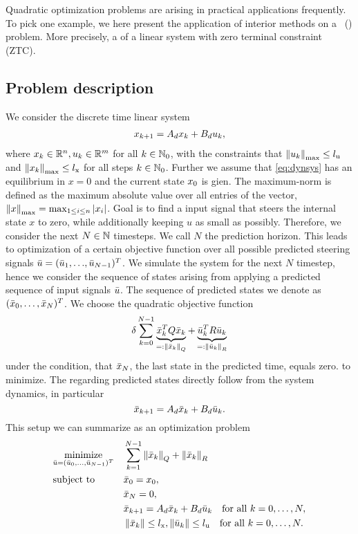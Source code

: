 Quadratic optimization problems are arising in practical applications frequently. To pick one example, we here present the application of interior methods on a \mpclong \ (\mpc) problem. More precisely, a \mpc of a linear system with zero terminal constraint (ZTC).

\subsection{Problem description \mpc}
We consider the discrete time linear system
\begin{align}
	x_{k+1} = A_d x_k + B_d u_k, \label{eq:dynsys}
\end{align}
where $ x_k \in \mathbb{R}^n, u_k \in \mathbb{R}^m $ for all $ k \in  \mathbb{N}_0$, with the constraints that $ {\left\lVert u_k\right\rVert}_{\mathrm{max}} \leq {l}_{\mathrm{u}}$
and $ {\left\lVert x_k\right\rVert}_{\mathrm{max}} \leq {l}_{\mathrm{x}} $ for all steps $ k\in \mathbb{N}_0 $. Further we assume that \eqref{eq:dynsys} has an equilibrium in $ x = 0 $ and the current state $ x_0 $ is gien. The maximum-norm is defined as the maximum absolute value over all entries of the vector, ${\left\lVert x\right\rVert}_{\mathrm{max}} = \max_{1\leq i\leq n } |x_i| $.
Goal is to find a input signal that steers the internal state $ x $ to zero, while additionally keeping $ u $ as small as possibly. Therefore, we consider the next $ N \in \mathbb{N} $ timesteps. We call $ N $ the prediction horizon.
This leads to optimization of a certain objective function over all possible predicted steering signals $ \bar{u} = ({\bar{u}_1},{\dots},{\bar{u}_{N-1}})^T $. We simulate the system for the next $ N $ timestep, hence we consider the sequence of states arising from applying a predicted sequence of input signals $ \bar{u} $. The sequence of predicted states we denote as $ (\bar{x}_0,\dots,\bar{x}_N)^T $.
We choose the quadratic objective function \[ \delta \sum_{k = 0}^{N-1} \underbrace{\bar{x}_k^T Q \bar{x}_k }_{=: \left\lVert\bar{x}_k\right\rVert_Q}+ \underbrace{\bar{u}_k ^T R \bar{u}_k}_{=:\left\lVert\bar{u}_k\right\rVert_R}\] under the condition, that $ \bar{x}_N $, the last state in the predicted time, equals zero. 
to minimize. The regarding predicted states directly follow from the system dynamics, in particular
\[ \bar{x}_{k+1} = A_d \bar{x}_k + B_d \bar{u}_k. \]
This setup we can summarize as an optimization problem
\begin{equation}
	\begin{aligned}
	& \underset{\bar{u}=(\bar{u}_0,\dots,\bar{u}_{N-1})^T}{\text{minimize}}
	& & \sum_{k = 1}^{N-1} \left\lVert\bar{x}_k\right\rVert_Q + \left\lVert\bar{x}_k\right\rVert_R\\
	& \text{subject to}
	& & \bar{x}_0 = x_0,\\
	& & &\bar{x}_N = 0,\\
	& & &\bar{x}_{k+1} = A_d \bar{x}_k + B_d \bar{u}_k \text{\quad for all } k = 0,\dots,N,\\
	& & &\left\lVert\bar{x}_k\right\rVert \leq {l}_{\mathrm{x}}, \left\lVert\bar{u}_k\right\rVert \leq {l}_{\mathrm{u}} \text{\quad for all } k = 0,\dots,N.
	\end{aligned}
\end{equation}

